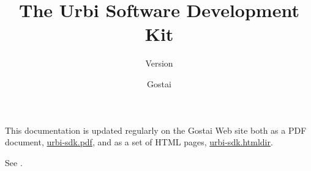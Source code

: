 \documentclass[openright,twoside,11pt,final]{book}
\title{The Urbi Software Development Kit}
\subtitle{Version \VcsDescription}
\author{Gostai}
\begin{document}
\maketitle

This documentation is updated regularly on the Gostai Web site both as
a PDF document, \href{\docurl/urbi-sdk.pdf}{urbi-sdk.pdf}, and as a
set of HTML pages, \href{\docurl/urbi-sdk.htmldir}{urbi-sdk.htmldir}.

See \href{\docurl}{\docurl}.



\tableofcontents









\end{document}
